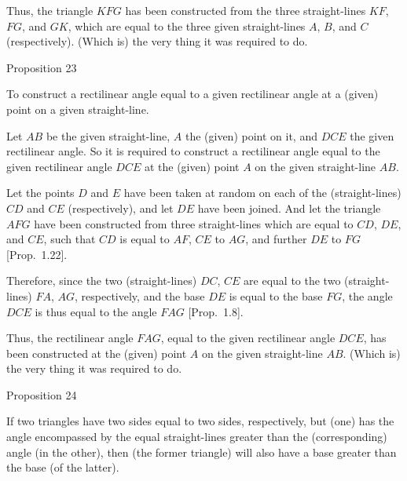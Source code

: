 Thus, the triangle $KFG$ has been constructed from the three straight-lines
$KF$, $FG$, and $GK$, which are equal to the three given straight-lines
$A$, $B$, and $C$ (respectively). (Which is) the very thing it was required
to do.


\begin{center}
{\large Proposition 23}
\end{center}

To construct a rectilinear angle equal to a given rectilinear angle at a (given)
point on a given straight-line.\\

\epsfysize=2.2in
\centerline{}

Let $AB$ be the given straight-line,  $A$ the (given) point on it, and 
$DCE$ the given rectilinear angle. So it is required to construct a rectilinear
angle equal to the given rectilinear angle $DCE$ at the (given) point
$A$ on the given straight-line
$AB$.

Let the points $D$ and $E$ have been taken at random on each
of the (straight-lines) $CD$ and $CE$ (respectively), and let $DE$ have been joined.
And let the triangle $AFG$ have been constructed from three straight-lines
which are equal to $CD$, $DE$, and $CE$, such that $CD$ is equal to $AF$,
$CE$ to $AG$, and further $DE$ to $FG$ [Prop.~1.22].

Therefore, since the two (straight-lines) $DC$, $CE$ are equal to the
two (straight-lines) $FA$, $AG$, respectively, and the base $DE$ is equal to
the base $FG$, the angle $DCE$ is thus equal to the angle $FAG$ [Prop.~1.8].

Thus, the rectilinear angle $FAG$,  equal to the  given
rectilinear angle $DCE$, has been constructed at the (given) point $A$ on the given straight-line $AB$.
(Which is) the very thing it was required to do.


\begin{center}
{\large Proposition 24}
\end{center}

If two triangles have two sides equal to two sides, respectively,
but (one) has the angle encompassed by the equal straight-lines greater than the (corresponding)
angle (in the other), then (the former triangle) will also have a base greater than the base (of the latter).

